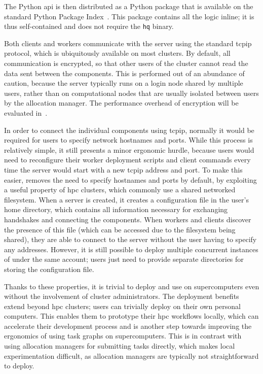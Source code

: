 The \hyperqueue{} Python \gls{api} is then distributed as a Python package
that is available on the standard Python Package Index~\cite{hq_pypi}. This package
contains all the \hq{} logic inline; it is thus self-contained and does not
require the \texttt{hq} binary.

Both clients and workers communicate with the server using the standard \gls{tcpip}
protocol, which is ubiquitously available on most clusters. By default, all communication is
encrypted, so that other users of the cluster cannot read the data sent between the
\hyperqueue{} components. This is performed out of an abundance of caution, because the
server typically runs on a login node shared by multiple users, rather than on computational nodes
that are usually isolated between users by the allocation manager. The performance overhead of
encryption will be evaluated in~.

In order to connect the individual components using \gls{tcpip}, normally it would be
required for users to specify network hostnames and ports. While this process is relatively simple,
it still presents a minor ergonomic hurdle, because users would need to reconfigure their worker
deployment scripts and client commands every time the server would start with a new
\gls{tcpip} address and port. To make this easier, \hyperqueue{} removes the
need to specify hostnames and ports by default, by exploiting a useful property of
\gls{hpc} clusters, which commonly use a shared networked filesystem. When a server
is created, it creates a configuration file in the user's home directory, which contains all
information necessary for exchanging handshakes and connecting the components. When workers and
clients discover the presence of this file (which can be accessed due to the filesystem being
shared), they are able to connect to the server without the user having to specify any addresses.
However, it is still possible to deploy multiple concurrent instances of \hyperqueue{}
under the same account; users just need to provide separate directories for storing the
configuration file.

Thanks to these properties, it is trivial to deploy and use \hyperqueue{} on
supercomputers even without the involvement of cluster administrators. The deployment benefits
extend beyond \gls{hpc} clusters; users can trivially deploy \hyperqueue{}
on their own personal computers. This enables them to prototype their \gls{hpc}
workflows locally, which can accelerate their development process and is another step towards
improving the ergonomics of using task graphs on supercomputers. This is in contrast with using
allocation managers for submitting tasks directly, which makes local experimentation difficult, as
allocation managers are typically not straightforward to deploy.

